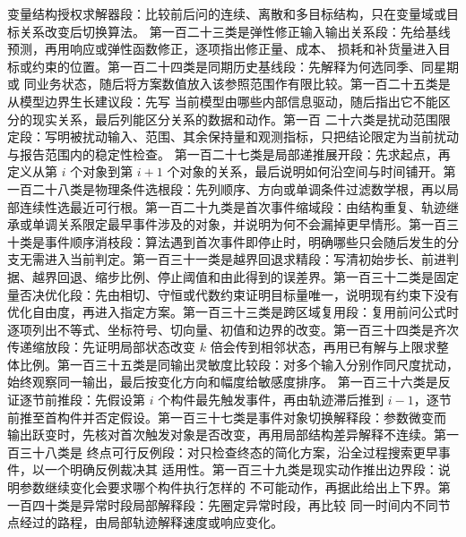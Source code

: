 变量结构授权求解器段：比较前后问的连续、离散和多目标结构，只在变量域或目标关系改变后切换算法。
第一百二十三类是弹性修正输入输出关系段：先给基线预测，再用响应或弹性函数修正，逐项指出修正量、成本、
损耗和补货量进入目标或约束的位置。第一百二十四类是同期历史基线段：先解释为何选同季、同星期或
同业务状态，随后将方案数值放入该参照范围作有限比较。第一百二十五类是从模型边界生长建议段：先写
当前模型由哪些内部信息驱动，随后指出它不能区分的现实关系，最后列能区分关系的数据和动作。第一百
二十六类是扰动范围限定段：写明被扰动输入、范围、其余保持量和观测指标，只把结论限定为当前扰动
与报告范围内的稳定性检查。
第一百二十七类是局部递推展开段：先求起点，再定义从第 $i$ 个对象到第 $i+1$ 个对象的关系，最后说明如何沿空间与时间铺开。第一百二十八类是物理条件选根段：先列顺序、方向或单调条件过滤数学根，再以局部连续性选最近可行根。第一百二十九类是首次事件缩域段：由结构重复、轨迹继承或单调关系限定最早事件涉及的对象，并说明为何不会漏掉更早情形。第一百三十类是事件顺序消枝段：算法遇到首次事件即停止时，明确哪些只会随后发生的分支无需进入当前判定。第一百三十一类是越界回退求精段：写清初始步长、前进判据、越界回退、缩步比例、停止阈值和由此得到的误差界。第一百三十二类是固定量否决优化段：先由相切、守恒或代数约束证明目标量唯一，说明现有约束下没有优化自由度，再进入指定方案。第一百三十三类是跨区域复用段：复用前问公式时逐项列出不等式、坐标符号、切向量、初值和边界的改变。第一百三十四类是齐次传递缩放段：先证明局部状态改变 $k$ 倍会传到相邻状态，再用已有解与上限求整体比例。第一百三十五类是同输出灵敏度比较段：对多个输入分别作同尺度扰动，始终观察同一输出，最后按变化方向和幅度给敏感度排序。
第一百三十六类是反证逐节前推段：先假设第 $i$ 个构件最先触发事件，再由轨迹滞后推到
$i-1$，逐节前推至首构件并否定假设。第一百三十七类是事件对象切换解释段：参数微变而
输出跃变时，先核对首次触发对象是否改变，再用局部结构差异解释不连续。第一百三十八类是
终点可行反例段：对只检查终态的简化方案，沿全过程搜索更早事件，以一个明确反例裁决其
适用性。第一百三十九类是现实动作推出边界段：说明参数继续变化会要求哪个构件执行怎样的
不可能动作，再据此给出上下界。第一百四十类是异常时段局部解释段：先圈定异常时段，再比较
同一时间内不同节点经过的路程，由局部轨迹解释速度或响应变化。


